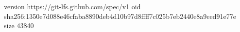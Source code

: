 version https://git-lfs.github.com/spec/v1
oid sha256:1350e7d088e46cfaba8890deb4d10b97d8ffff7c025b7eb2440e8a9eed91e77e
size 43840
